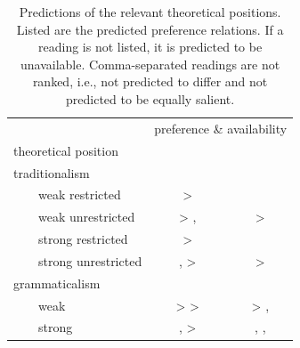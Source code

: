 \documentclass[fleqn,reqno,10pt]{article}
\newcommand{\lit}{\acro{lit}}
\newcommand{\glb}{\acro{glb}}
\newcommand{\loc}{\acro{loc}}
\newcommand{\as}{\acro{as}}
\renewcommand{\es}{\acro{es}}
\begin{document}
\begin{table}[t]
  \centering
  \begin{tabular}{lcc}
    & \multicolumn{2}{c}{preference \& availability}
    \\ \cmidrule(r){2-3}
    theoretical position
    & \as
    & \es
    \\ \midrule
    traditionalism
    \\
    \ \ \ \ weak restricted 
    & \lit > \glb 
    & \lit 
    \\
    \ \ \ \ weak unrestricted
    & \lit > \glb , \loc 
    & \lit > \glb
    \\
    \ \ \ \ strong restricted
    & \glb > \lit 
    & \lit 
    \\
    \ \ \ \ strong unrestricted
    & \glb , \loc > \lit 
    & \glb > \lit
    \\
    grammaticalism
    \\
    \ \ \ \ weak
    & \loc > \glb > \lit 
    & \glb > \lit, \loc
    \\
    \ \ \ \ strong
    & \glb, \loc > \lit 
    & \glb, \loc , \lit
    \\
  \end{tabular}
  \caption{Predictions of the relevant theoretical positions. Listed
    are the predicted preference relations. If a reading is not
    listed, it is predicted to be unavailable. Comma-separated
    readings are not ranked, i.e., not predicted to differ and not
    predicted to be equally salient.}
  \label{tab:predictions}
\end{table}
\end{document}
